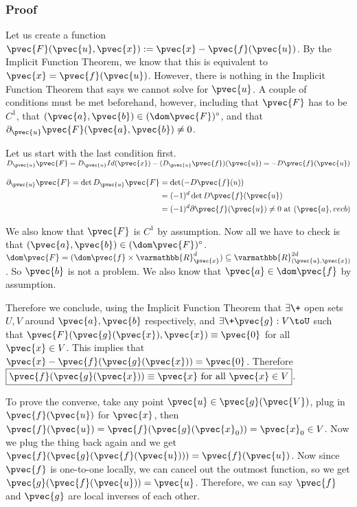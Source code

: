 \documentclass[11 pt, twoside]{article}
\begin{document}
\subsubsection{Proof}

Let us create a function $\pvec{F} (\pvec{u}, \pvec{x}) := \pvec{x} -
\pvec{f}(\pvec{u})$. By the Implicit Function Theorem, we know that this is
equivalent to $\pvec{x} = \pvec{f}(\pvec{u})$. However, there is nothing in the
Implicit Function Theorem that says we cannot solve for $\pvec{u}$. A couple of
conditions must be met beforehand, however, including that $\pvec{F}$ has to be
$C^1$, that $(\pvec{a}, \pvec{b}) \in (\dom \pvec{F})^\circ$, and that
$\partial_{\pvec{u}} \pvec{F}(\pvec{a}, \pvec{b}) \neq 0$.

Let us start with the last condition first. $D_{\pvec{u}} \pvec{F} = D_{\pvec{u}}
Id(\pvec{x}) - (D_{\pvec{u}}\pvec{f})(\pvec{u}) = -D\pvec{f}(\pvec{u})$

\begin{align*}
\partial_{\pvec{u}}\pvec{F} = \det D_{\pvec{u}}\pvec{F} &= \det (-D\pvec{f}(u))\\
                            &= (-1)^d \det
D\pvec{f}(\pvec{u})\\
&= (-1)^d \partial \pvec{f}(\pvec{u}) \neq 0 \text{ at } (\pvec{a}, vec{b})\\
\end{align*}

We also know that $\pvec{F}$ is $C^1$ by assumption. Now all we have to check is
that $(\pvec{a}, \pvec{b}) \in (\dom \pvec{F})^\circ$. $\dom \pvec{F} = (\dom
\pvec{f} \times \varmathbb{R}^d_{\pvec{x}}) \subseteq
\varmathbb{R}^{2d}_{(\pvec{u}, \pvec{x})}$. So $\pvec{b}$ is not a problem. We also
know that $\pvec{a} \in \dom \pvec{f}$ by assumption.

Therefore we conclude, using the Implicit Function Theorem that $\exists\+$ open
sets $U, V$ around $\pvec{a}, \pvec{b}$ respectively, and $\exists\+ \pvec{g}:
V\toU$ such that $\pvec{F}(\pvec{g}(\pvec{x}), \pvec{x}) \equiv \pvec{0}$ for all
$\pvec{x} \in V$. This implies that $\pvec{x} - \pvec{f}(\pvec{g}(\pvec{x})) =
\pvec{0}$. Therefore $\boxed{\pvec{f}(\pvec{g}(\pvec{x})) \equiv \pvec{x} \text{ for
all } \pvec{x} \in V}$.

To prove the converse, take any point $\pvec{u} \in \pvec{g}(\pvec{V})$, plug in
$\pvec{f}(\pvec{u})$ for $\pvec{x}$, then $\pvec{f}(\pvec{u}) =
\pvec{f}(\pvec{g}(\pvec{x}_0)) = \pvec{x}_0 \in V$. Now we plug the thing back again
and we get $\pvec{f}(\pvec{g}(\pvec{f}(\pvec{u}))) = \pvec{f}(\pvec{u})$. Now since
$\pvec{f}$ is one-to-one locally, we can cancel out the outmost function, so we
get $\pvec{g}(\pvec{f}(\pvec{u})) = \pvec{u}$. Therefore, we can say $\pvec{f}$ and
$\pvec{g}$ are local inverses of each other.
\end{document}
